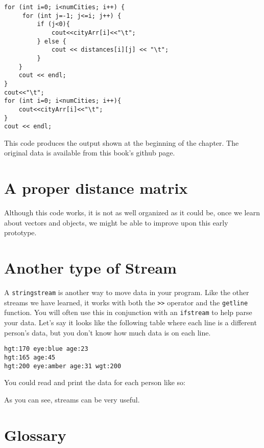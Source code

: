 \begin{lstlisting}
for (int i=0; i<numCities; i++) {
     for (int j=-1; j<=i; j++) {
         if (j<0){
             cout<<cityArr[i]<<"\t";
         } else {
             cout << distances[i][j] << "\t";
         }
    }
    cout << endl;
}
cout<<"\t";
for (int i=0; i<numCities; i++){
    cout<<cityArr[i]<<"\t";
}
cout << endl;
\end{lstlisting}
%
This code produces the output shown at the beginning of the
chapter.  The original data is available from this book's github page.

\section{A proper distance matrix}

Although this code works, it is not as well organized as it
could be, once we learn about vectors and objects, we might be able to improve upon this early prototype.  

\section{Another type of Stream}

A {\tt stringstream} is another way to move data in your program.  Like the other streams we have learned, it works with both the {\tt >>} operator
and the {\tt getline} function.  You will often use this in conjunction with an {\tt ifstream} to help parse your data.  Let's say it looks like the following table where each line is a different person's data, but you don't know how much data is on each line. 

\begin{verbatim}
hgt:170 eye:blue age:23 
hgt:165 age:45
hgt:200 eye:amber age:31 wgt:200
\end{verbatim}

You could read and print the data for each person like so:


As you can see, streams can be very useful. 

\section{Glossary}

